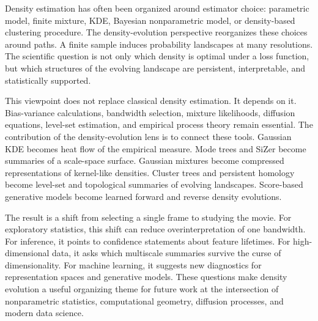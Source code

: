 \documentclass[preprint]{imsart}
\theoremstyle{plain}
\theoremstyle{definition}
\begin{document}
Density estimation has often been organized around estimator choice: parametric model, finite mixture, KDE, Bayesian nonparametric model, or density-based clustering procedure. The density-evolution perspective reorganizes these choices around paths. A finite sample induces probability landscapes at many resolutions. The scientific question is not only which density is optimal under a loss function, but which structures of the evolving landscape are persistent, interpretable, and statistically supported.

This viewpoint does not replace classical density estimation. It depends on it. Bias-variance calculations, bandwidth selection, mixture likelihoods, diffusion equations, level-set estimation, and empirical process theory remain essential. The contribution of the density-evolution lens is to connect these tools. Gaussian KDE becomes heat flow of the empirical measure. Mode trees and SiZer become summaries of a scale-space surface. Gaussian mixtures become compressed representations of kernel-like densities. Cluster trees and persistent homology become level-set and topological summaries of evolving landscapes. Score-based generative models become learned forward and reverse density evolutions.

The result is a shift from selecting a single frame to studying the movie. For exploratory statistics, this shift can reduce overinterpretation of one bandwidth. For inference, it points to confidence statements about feature lifetimes. For high-dimensional data, it asks which multiscale summaries survive the curse of dimensionality. For machine learning, it suggests new diagnostics for representation spaces and generative models. These questions make density evolution a useful organizing theme for future work at the intersection of nonparametric statistics, computational geometry, diffusion processes, and modern data science.
\end{document}
